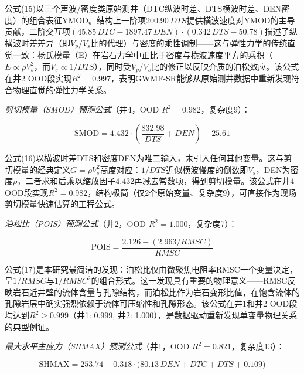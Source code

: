 \documentclass[a4paper,12pt]{ctexart}
\begin{document}
公式(15)以三个声波/密度类原始测井（DTC纵波时差、DTS横波时差、DEN密度）的组合表征YMOD。结构上一阶项$200.90\,DTS$提供横波速度对YMOD的主导贡献，二阶交互项$(45.85\,DTC - 1897.47\,DEN)\cdot(0.342\,DTS - 50.78)$描述了纵横波时差差异（即$V_p/V_s$比的代理）与密度的乘性调制——这与弹性力学的传统直觉一致：杨氏模量（E）在岩石力学中正比于密度与横波速度平方的乘积（$E \propto \rho V_s^2$，而$V_s \propto 1/DTS$），同时受$V_p/V_s$比的修正以反映介质的泊松效应。该公式在井2 OOD段实现$R^2=0.997$，表明GWMF-SR能够从原始测井数据中重新发现符合物理直觉的弹性力学关系。

\vspace{0.5em}

\textit{剪切模量（SMOD）预测公式}（井4，OOD $R^2=0.982$，复杂度9）：

\begin{equation}
\text{SMOD} = 4.432 \cdot \left(\frac{832.98}{DTS} + DEN\right) - 25.61 \tag{16}
\end{equation}

公式(16)以横波时差DTS和密度DEN为唯二输入，未引入任何其他变量。这与剪切模量的经典定义$G = \rho V_s^2$高度对应：$1/DTS$近似横波慢度的倒数即$V_s$，DEN为密度$\rho$，二者求和后乘以缩放因子$4.432$再减去常数项，得到剪切模量。该公式在井4 OOD段实现$R^2=0.982$，结构极简（仅2个原始变量、复杂度9），可直接作为现场剪切模量快速估算的工程公式。

\vspace{0.5em}

\textit{泊松比（POIS）预测公式}（井2，OOD $R^2=1.000$，复杂度7）：

\begin{equation}
\text{POIS} = \frac{2.126 - (2.963 / RMSC)}{RMSC} \tag{17}
\end{equation}

公式(17)是本研究最简洁的发现：泊松比仅由微聚焦电阻率RMSC一个变量决定，呈$1/RMSC$与$1/RMSC^2$的组合形式。这一发现具有重要的物理意义——RMSC反映岩石近井壁的流体含量与孔隙结构，而泊松比作为岩石变形比值，在饱含流体的孔隙岩层中确实强烈依赖于流体可压缩性和孔隙形态。该公式在井1和井2 OOD段均达到$R^2 \geq 0.999$（井1: 0.999, 井2: 1.000），是数据驱动重新发现单变量物理关系的典型例证。

\vspace{0.5em}

\textit{最大水平主应力（SHMAX）预测公式}（井1，OOD $R^2=0.821$，复杂度13）：

\begin{equation}
\text{SHMAX} = 253.74 - 0.318\cdot\bigl(80.13\,DEN + DTC + DTS + 0.109\bigr) \tag{18}
\end{equation}
\end{document}
